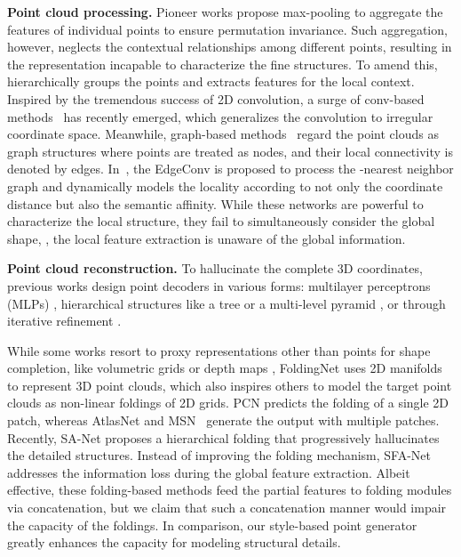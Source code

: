 \documentclass[final]{cvpr}
\begin{document}
\noindent\textbf{Point cloud processing.}
Pioneer works \cite{qi2017pointnet,zaheer2017deep} propose max-pooling to aggregate the features of individual points to ensure permutation invariance. Such aggregation, however, neglects the contextual relationships among different points, resulting in the representation incapable to characterize the fine structures. To amend this, \cite{qi2017pointnet++} hierarchically groups the points and extracts features for the local context. Inspired by the tremendous success of 2D convolution, a surge of conv-based methods~\cite{hua2018pointwise,xu2018spidercnn,groh2018flex,atzmon2018point,li2018pointcnn,thomas2019kpconv,dgcnn} has recently emerged, which generalizes the convolution to irregular coordinate space. Meanwhile, graph-based methods~\cite{dgcnn,wang2018local} regard the point clouds as graph structures where points are treated as nodes, and their local connectivity is denoted by edges. In~\cite{dgcnn}, the EdgeConv is proposed to process the -nearest neighbor graph and dynamically models the locality according to not only the coordinate distance but also the semantic affinity. While these networks are powerful to characterize the local structure, they fail to simultaneously consider the global shape, \ie, the local feature extraction is unaware of the global information.

\noindent\textbf{Point cloud reconstruction.}
To hallucinate the complete 3D coordinates, previous works design point decoders in various forms: multilayer perceptrons (MLPs) \cite{chen2019unpaired}, hierarchical structures like a tree \cite{topnet_2019_CVPR} or a multi-level pyramid \cite{pfnet_2020_CVPR}, or through iterative refinement \cite{cascaded_2020_CVPR}.



While some works resort to proxy representations other than points for shape completion, like volumetric grids \cite{dai2017shape,xie2020grnet} or depth maps \cite{hu2019render4completion}, FoldingNet \cite{foldingnet_2018_CVPR} uses 2D manifolds to represent 3D point clouds, which also inspires others to model the target point clouds as non-linear foldings of 2D grids. 
PCN \cite{Yuan-2018-pcn} predicts the folding of a single 2D patch, whereas AtlasNet \cite{atlasnet2018} and MSN~\cite{liu2019morphing} generate the output with multiple patches. Recently, SA-Net \cite{wen2020point} proposes a hierarchical folding that progressively hallucinates the detailed structures. Instead of improving the folding mechanism, SFA-Net~\cite{detailpreserved_eccv2020} addresses the information loss during the global feature extraction. Albeit effective, these folding-based methods feed the partial features to folding modules via concatenation, but we claim that such a concatenation manner would impair the capacity of the foldings. In comparison, our style-based point generator greatly enhances the capacity for modeling structural details.
\end{document}

